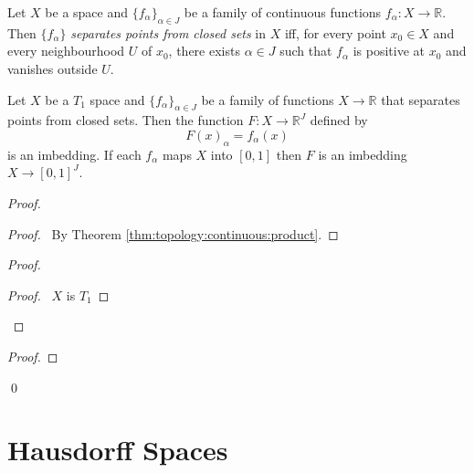   \begin{df}
  Let $X$ be a space and $\{ f_\alpha \}_{\alpha \in J}$ be a family of
   continuous functions $f_\alpha : X \rightarrow \mathbb{R}$. Then $\{
   f_\alpha \}$ \emph{separates points from closed sets} in $X$ iff, for
every point $x_0 \in X$ and every neighbourhood $U$ of $x_0$, there exists
$\alpha \in J$ such that $f_\alpha$ is positive at $x_0$ and vanishes outside
$U$.
\end{df}

 \begin{thm}
 Let $X$ be a $T_1$ space and $\{ f_\alpha \}_{\alpha \in J}$ be a family of
 functions $X \rightarrow \mathbb{R}$ that separates points from closed sets.
 Then the function $F : X \rightarrow \mathbb{R}^J$ defined by
 \[ F(x)_\alpha = f_\alpha(x) \]
 is an imbedding. If each $f_\alpha$ maps $X$ into $[0,1]$ then $F$ is an
 imbedding $X \rightarrow [0,1]^J$.
\end{thm}

\begin{proof}
\pf
{}
\begin{proof}
  \pf\ By Theorem \ref{thm:topology:continuous:product}.
\end{proof}
\begin{proof}
  \begin{proof}
    \pf\ $X$ is $T_1$
  \end{proof}
\end{proof}
\begin{proof}
\end{proof}
\qed
\end{proof}


\section{Hausdorff Spaces}

